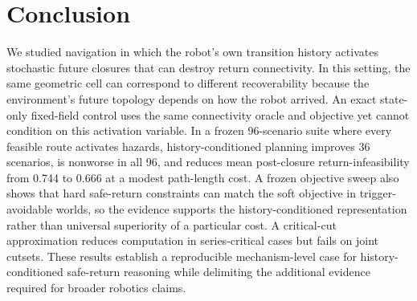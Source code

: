 \documentclass[conference]{IEEEtran}
\begin{document}
\section{Conclusion}
We studied navigation in which the robot's own transition history activates stochastic future closures that can destroy return connectivity. In this setting, the same geometric cell can correspond to different recoverability because the environment's future topology depends on how the robot arrived. An exact state-only fixed-field control uses the same connectivity oracle and objective yet cannot condition on this activation variable. In a frozen 96-scenario suite where every feasible route activates hazards, history-conditioned planning improves 36 scenarios, is nonworse in all 96, and reduces mean post-closure return-infeasibility from 0.744 to 0.666 at a modest path-length cost. A frozen objective sweep also shows that hard safe-return constraints can match the soft objective in trigger-avoidable worlds, so the evidence supports the history-conditioned representation rather than universal superiority of a particular cost. A critical-cut approximation reduces computation in series-critical cases but fails on joint cutsets. These results establish a reproducible mechanism-level case for history-conditioned safe-return reasoning while delimiting the additional evidence required for broader robotics claims.



\end{document}
